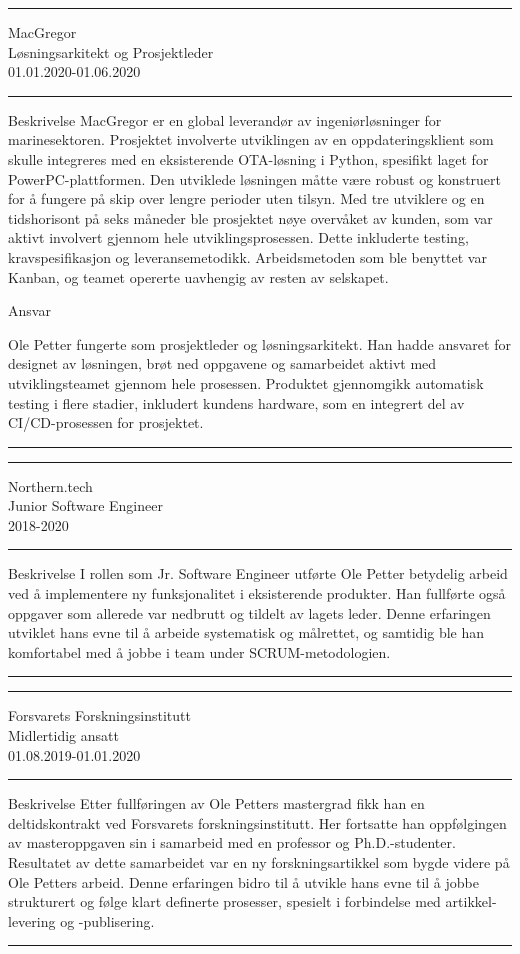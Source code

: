 \documentclass[11pt]{article}
\newenvironment*{experience}[3]{
  \par\noindent\rule{\textwidth}{0.4pt}
  #1 \\
  #2 \\
  #3 \\
  \par\noindent\rule{\textwidth}{0.4pt}
}
{\par\noindent\rule{\textwidth}{0.4pt}} %
\begin{document}
\begin{experience}{MacGregor}{Løsningsarkitekt og Prosjektleder}{01.01.2020-01.06.2020}
Beskrivelse
MacGregor er en global leverandør av ingeniørløsninger for marinesektoren.
Prosjektet involverte utviklingen av en oppdateringsklient som skulle integreres med en eksisterende OTA-løsning i
Python, spesifikt laget for PowerPC-plattformen. Den utviklede løsningen måtte være robust og konstruert for å
fungere på skip over lengre perioder uten tilsyn.
Med tre utviklere og en tidshorisont på seks måneder ble prosjektet nøye overvåket av kunden, som var aktivt
involvert gjennom hele utviklingsprosessen. Dette inkluderte testing, kravspesifikasjon og leveransemetodikk.
Arbeidsmetoden som ble benyttet var Kanban, og teamet opererte uavhengig av resten av selskapet.

Ansvar

Ole Petter fungerte som prosjektleder og løsningsarkitekt. Han hadde ansvaret for designet av løsningen, brøt ned
oppgavene og samarbeidet aktivt med utviklingsteamet gjennom hele prosessen. Produktet gjennomgikk
automatisk testing i flere stadier, inkludert kundens hardware, som en integrert del av CI/CD-prosessen for
prosjektet.

\end{experience}

\begin{experience}{Northern.tech}{Junior Software Engineer}{2018-2020}
  Beskrivelse
  I rollen som Jr. Software Engineer utførte Ole Petter betydelig arbeid ved å implementere ny funksjonalitet i
  eksisterende produkter. Han fullførte også oppgaver som allerede var nedbrutt og tildelt av lagets leder. Denne
  erfaringen utviklet hans evne til å arbeide systematisk og målrettet, og samtidig ble han komfortabel med å jobbe i
  team under SCRUM-metodologien.

\end{experience}

\begin{experience}{Forsvarets Forskningsinstitutt}{Midlertidig ansatt}{01.08.2019-01.01.2020}
  Beskrivelse
  Etter fullføringen av Ole Petters mastergrad fikk han en deltidskontrakt ved Forsvarets forskningsinstitutt. Her
  fortsatte han oppfølgingen av masteroppgaven sin i samarbeid med en professor og Ph.D.-studenter. Resultatet av
  dette samarbeidet var en ny forskningsartikkel som bygde videre på Ole Petters arbeid. Denne erfaringen bidro til å
  utvikle hans evne til å jobbe strukturert og følge klart definerte prosesser, spesielt i forbindelse med
  artikkel-levering og -publisering.
\end{experience}
\end{document}
